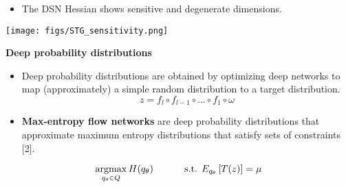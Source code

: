 \documentclass[landscape]{article}
\def\argmax{\qopname\relax n{argmax}}
\newcommand{\mysection}[1]{{\color[rgb]{.6,0,0}{\section*{{\LARGE #1}
        {\leaders\hrule height .2ex\hfill\kern0pt}}}}}
\begin{document}
\begin{minipage}[c]{0.29\linewidth}
\begin{multicols*}{2}
\begin{itemize}
\item The DSN Hessian shows sensitive and degenerate dimensions.
\end{itemize}
\columnbreak
\begin{center}
\texttt{[image: figs/STG\_sensitivity.png]}
\end{center}
\end{multicols*}

\mysection{Methods}
{\LARGE \textbf{Deep probability distributions}}
\begin{itemize}
\item Deep probability distributions are obtained by optimizing deep networks to map (approximately) a simple random distribution to a target distribution.
\[z = f_l \circ f_{l-1} \circ ... \circ f_1 \circ \omega \]
\end{itemize}
\begin{center}
\end{center}
\begin{itemize}
\item \textbf{Max-entropy flow networks} are deep probability distributions that approximate maximum entropy distributions that satisfy sets of constraints [2].
\end{itemize}
{\Large
 \begin{equation*}
\argmax_{q_\theta \in Q} H(q_\theta) \text{\hspace{.4in} s.t. } E_{q_\theta} \left[T(z) \right] = \mu 
\end{equation*}}


\end{minipage}
\end{document}
